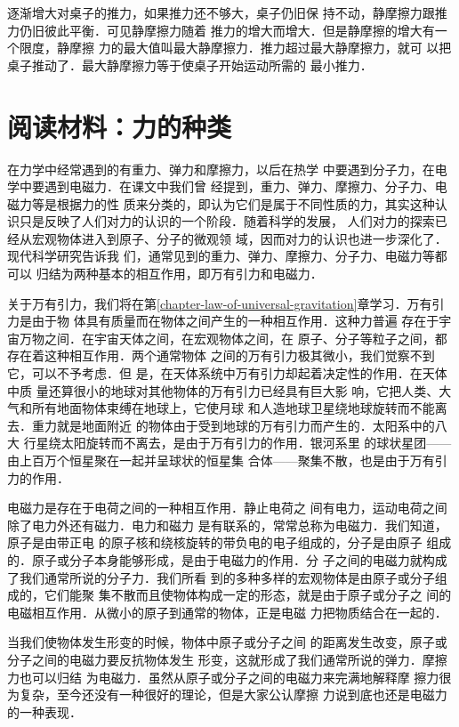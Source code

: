     逐渐增大对桌子的推力，如果推力还不够大，桌子仍旧保
持不动，静摩擦力跟推力仍旧彼此平衡．可见静摩擦力随着
推力的增大而增大．但是静摩擦的增大有一个限度，静摩擦
力的最大值叫最大静摩擦力．推力超过最大静摩擦力，就可
以把桌子推动了．最大静摩擦力等于使桌子开始运动所需的
最小推力．


\section*{阅读材料：力的种类} 
    在力学中经常遇到的有重力、弹力和摩擦力，以后在热学
中要遇到分子力，在电学中要遇到电磁力．在课文中我们曾
经提到，重力、弹力、摩擦力、分子力、电磁力等是根据力的性
质来分类的，即认为它们是属于不同性质的力，其实这种认
识只是反映了人们对力的认识的一个阶段．随着科学的发展，
人们对力的探索已经从宏观物体进入到原子、分子的微观领
域，因而对力的认识也进一步深化了．现代科学研究告诉我
们，通常见到的重力、弹力、摩擦力、分子力、电磁力等都可以
归结为两种基本的相互作用，即万有引力和电磁力．

    关于万有引力，我们将在第\ref{chapter-law-of-universal-gravitation}章学习．万有引力是由于物
体具有质量而在物体之间产生的一种相互作用．这种力普遍
存在于宇宙万物之间．在宇宙天体之间，在宏观物体之间，在
原子、分子等粒子之间，都存在着这种相互作用．两个通常物体
之间的万有引力极其微小，我们觉察不到它，可以不予考虑．但
是，在天体系统中万有引力却起着决定性的作用．在天体中质
量还算很小的地球对其他物体的万有引力已经具有巨大影
响，它把人类、大气和所有地面物体束缚在地球上，它使月球
和人造地球卫星绕地球旋转而不能离去．重力就是地面附近
的物体由于受到地球的万有引力而产生的．太阳系中的八大
行星绕太阳旋转而不离去，是由于万有引力的作用．银河系里
的球状星团——由上百万个恒星聚在一起并呈球状的恒星集
合体——聚集不散，也是由于万有引力的作用．

    电磁力是存在于电荷之间的一种相互作用．静止电荷之
间有电力，运动电荷之间除了电力外还有磁力．电力和磁力
是有联系的，常常总称为电磁力．我们知道，原子是由带正电
的原子核和绕核旋转的带负电的电子组成的，分子是由原子
组成的．原子或分子本身能够形成，是由于电磁力的作用．分
子之间的电磁力就构成了我们通常所说的分子力．我们所看
到的多种多样的宏观物体是由原子或分子组成的，它们能聚
集不散而且使物体构成一定的形态，就是由于原子或分子之
间的电磁相互作用．从微小的原子到通常的物体，正是电磁
力把物质结合在一起的．

    当我们使物体发生形变的时候，物体中原子或分子之间
的距离发生改变，原子或分子之间的电磁力要反抗物体发生
形变，这就形成了我们通常所说的弹力．摩擦力也可以归结
为电磁力．虽然从原子或分子之间的电磁力来完满地解释摩
擦力很为复杂，至今还没有一种很好的理论，但是大家公认摩擦
力说到底也还是电磁力的一种表现．

